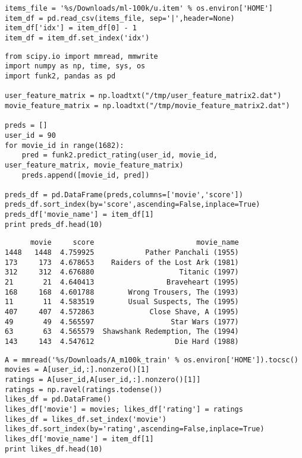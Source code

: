 \documentclass[12pt,fleqn]{article}\usepackage{../common}
\begin{document}
\begin{verbatim}
items_file = '%s/Downloads/ml-100k/u.item' % os.environ['HOME']
item_df = pd.read_csv(items_file, sep='|',header=None)
item_df['idx'] = item_df[0] - 1
item_df = item_df.set_index('idx')
\end{verbatim}


\begin{verbatim}
from scipy.io import mmread, mmwrite
import numpy as np, time, sys, os
import funk2, pandas as pd

user_feature_matrix = np.loadtxt("/tmp/user_feature_matrix2.dat")
movie_feature_matrix = np.loadtxt("/tmp/movie_feature_matrix2.dat")

preds = []
user_id = 90
for movie_id in range(1682):
    pred = funk2.predict_rating(user_id, movie_id, user_feature_matrix, movie_feature_matrix)
    preds.append([movie_id, pred])

preds_df = pd.DataFrame(preds,columns=['movie','score'])
preds_df.sort_index(by='score',ascending=False,inplace=True)
preds_df['movie_name'] = item_df[1]
print preds_df.head(10)
\end{verbatim}

\begin{verbatim}
      movie     score                        movie_name
1448   1448  4.759925            Pather Panchali (1955)
173     173  4.678653    Raiders of the Lost Ark (1981)
312     312  4.676880                    Titanic (1997)
21       21  4.640413                 Braveheart (1995)
168     168  4.601788        Wrong Trousers, The (1993)
11       11  4.583519        Usual Suspects, The (1995)
407     407  4.572863             Close Shave, A (1995)
49       49  4.565597                  Star Wars (1977)
63       63  4.565579  Shawshank Redemption, The (1994)
143     143  4.547612                   Die Hard (1988)
\end{verbatim}

\begin{verbatim}
A = mmread('%s/Downloads/A_m100k_train' % os.environ['HOME']).tocsc()
movies = A[user_id,:].nonzero()[1]
ratings = A[user_id,A[user_id,:].nonzero()[1]]
ratings = np.ravel(ratings.todense())
likes_df = pd.DataFrame()
likes_df['movie'] = movies; likes_df['rating'] = ratings
likes_df = likes_df.set_index('movie')
likes_df.sort_index(by='rating',ascending=False,inplace=True)
likes_df['movie_name'] = item_df[1]
print likes_df.head(10)
\end{verbatim}
\end{document}
